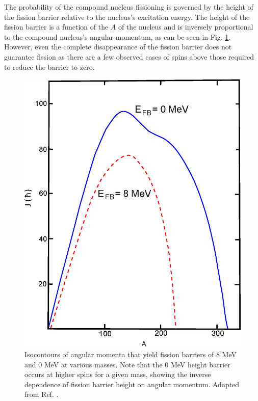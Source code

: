 The probability of the compound nucleus fissioning is governed by the height of the fission barrier relative to the nucleus's excitation energy. The height of the fission barrier is a function of the $A$ of the nucleus and is inversely proportional to the compound nucleus's angular momentum, as can be seen in Fig. \ref{fig:chp3-fission-barrier}. However, even the complete disappearance of the fission barrier does not guarantee fission as there are a few observed cases of spins above those required to reduce the barrier to zero\cite{hyperdef,hyperdef2}.

\begin{figure}[h!]
	\centerline{\includegraphics[height=0.3\textheight]{./img/c3/fission_barrier.eps}}
	\caption{Isocontours of angular momenta that yield fission barriers of $8$ MeV and $0$ MeV at various masses. Note that the $0$ MeV height barrier occurs at higher spins for a given mass, showing the inverse dependence of fission barrier height on angular momentum. Adapted from Ref. \cite{fissionBarrier2}.}
	\label{fig:chp3-fission-barrier}
\end{figure}


